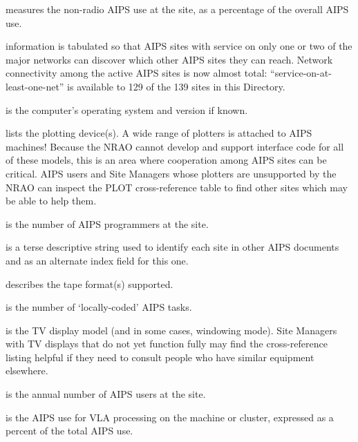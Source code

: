 measures the non-radio AIPS use at the site,
as a percentage of the overall AIPS use.

 information is tabulated so that AIPS sites
with service on only one or two of the major networks can discover which
other AIPS sites they can reach.  Network connectivity among the active
AIPS sites is now almost total: ``service-on-at-least-one-net'' is
available to 129 of the 139 sites in this Directory.

 is the computer's operating system and version if known.

 lists the plotting device(s).  A wide range of
plotters is attached to AIPS machines! Because the NRAO cannot develop
and support interface code for all of these models, this is an area
where cooperation among AIPS sites can be critical.  AIPS users and Site
Managers whose plotters are unsupported by the NRAO can inspect the PLOT
cross-reference table to find other sites which may be able to help
them.

 is the number of AIPS programmers at the
site.

 is a terse descriptive string used to identify each
site in other AIPS documents and as an alternate index field for this one.

 describes the tape format(s) supported.

 is the number of `locally-coded' AIPS
tasks.

 is the TV display model (and in some cases,
windowing mode).  Site Managers with TV displays that do not yet
function fully may find the cross-reference listing helpful if they need
to consult people who have similar equipment elsewhere.

 is the annual number of AIPS users at the site.

 is the AIPS use for VLA processing on the machine
or cluster, expressed as a percent of the total AIPS use.

\vfill\eject



\begindirectory

%

